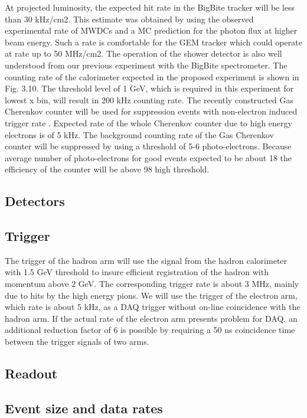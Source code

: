 \documentclass{article}
\begin{document}
At projected luminosity, the expected hit rate in the BigBite tracker will be less than
30 kHz/cm2. This estimate was obtained by using the observed experimental rate of MWDCs
and a MC prediction for the photon flux at higher beam energy. Such a rate is comfortable
for the GEM tracker which could operate at rate up to 50 MHz/cm2.
The operation of the shower detector is also well understood from our previous experiment
with the BigBite spectrometer. The counting rate of the calorimeter expected in the proposed
experiment is shown in Fig. 3.10. The threshold level of 1 GeV, which is required in this
experiment for lowest x bin, will result in 200 kHz counting rate. The recently constructed
Gas Cherenkov counter will be used for suppression events with non-electron induced trigger
rate . Expected rate of the whole Cherenkov counter due to high energy electrons is of 5 kHz.
The background counting rate of the Gas Cherenkov counter will be suppressed by using a
threshold of 5-6 photo-electrons. Because average number of photo-electrons for good events
expected to be about 18 the efficiency of the counter will be above 98%
high threshold.


\subsection{Detectors}


\subsection{Trigger}
The trigger of the hadron arm will use the signal from the hadron calorimeter with 1.5 GeV
threshold to insure efficient registration of the hadron with momentum above 2 GeV. The
corresponding trigger rate is about 3 MHz, mainly due to hits by the high energy pions.
We will use the trigger of the electron arm, which rate is about 5 kHz, as a DAQ trigger
without on-line coincidence with the hadron arm. If the actual rate of the electron arm
presents problem for DAQ, an additional reduction factor of 6 is possible by requiring a
50 ns coincidence time between the trigger signals of two arms.


\subsection{Readout}

\subsection{Event size and data rates}
\end{document}
